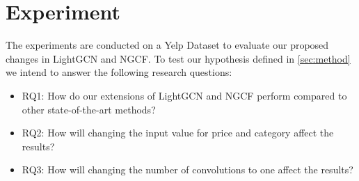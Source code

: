 \section{Experiment}\label{sec:experiment}
The experiments are conducted on a Yelp Dataset to evaluate our proposed changes in LightGCN and NGCF.
To test our hypothesis defined in \autoref{sec:method} we intend to answer the following research questions:
\begin{itemize}
    \item RQ1: How do our extensions of LightGCN and NGCF perform compared to other state-of-the-art methods?
    \item RQ2: How will changing the input value for price and category affect the results?
    \item RQ3: How will changing the number of convolutions to one affect the results?
\end{itemize}





